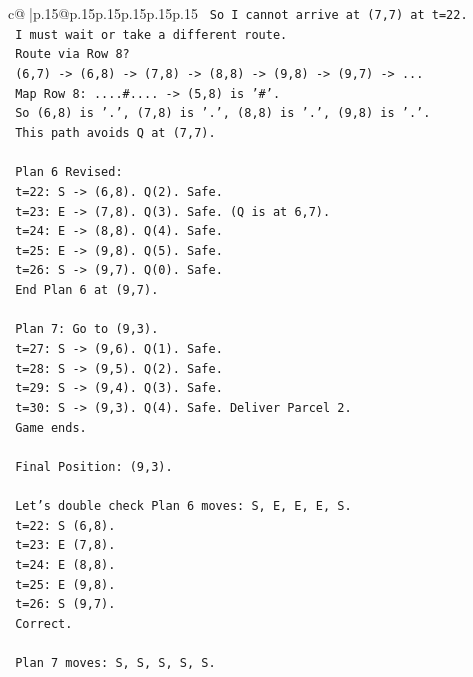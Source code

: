 \documentclass{article}
\begin{document}
{\begin{supertabular}{c@{$\;$}|p{.15\linewidth}@{}p{.15\linewidth}p{.15\linewidth}p{.15\linewidth}p{.15\linewidth}p{.15\linewidth}}
{{{\texttt{   So I cannot arrive at (7,7) at t=22.} \\
\texttt{   I must wait or take a different route.} \\
\texttt{   Route via Row 8?} \\
\texttt{   (6,7) {-}> (6,8) {-}> (7,8) {-}> (8,8) {-}> (9,8) {-}> (9,7) {-}> ...} \\
\texttt{   Map Row 8: ....\#.... {-}> (5,8) is '\#'.} \\
\texttt{   So (6,8) is '.', (7,8) is '.', (8,8) is '.', (9,8) is '.'.} \\
\texttt{   This path avoids Q at (7,7).} \\
\\ 
\texttt{   Plan 6 Revised:} \\
\texttt{   t=22: S {-}> (6,8). Q(2). Safe.} \\
\texttt{   t=23: E {-}> (7,8). Q(3). Safe. (Q is at 6,7).} \\
\texttt{   t=24: E {-}> (8,8). Q(4). Safe.} \\
\texttt{   t=25: E {-}> (9,8). Q(5). Safe.} \\
\texttt{   t=26: S {-}> (9,7). Q(0). Safe.} \\
\texttt{   End Plan 6 at (9,7).} \\
\\ 
\texttt{   Plan 7: Go to (9,3).} \\
\texttt{   t=27: S {-}> (9,6). Q(1). Safe.} \\
\texttt{   t=28: S {-}> (9,5). Q(2). Safe.} \\
\texttt{   t=29: S {-}> (9,4). Q(3). Safe.} \\
\texttt{   t=30: S {-}> (9,3). Q(4). Safe. Deliver Parcel 2.} \\
\texttt{   Game ends.} \\
\\ 
\texttt{   Final Position: (9,3).} \\
\\ 
\texttt{   Let's double check Plan 6 moves: S, E, E, E, S.} \\
\texttt{   t=22: S (6,8).} \\
\texttt{   t=23: E (7,8).} \\
\texttt{   t=24: E (8,8).} \\
\texttt{   t=25: E (9,8).} \\
\texttt{   t=26: S (9,7).} \\
\texttt{   Correct.} \\
\\ 
\texttt{   Plan 7 moves: S, S, S, S, S.} \\
}}}
\end{supertabular}}
\end{document}
